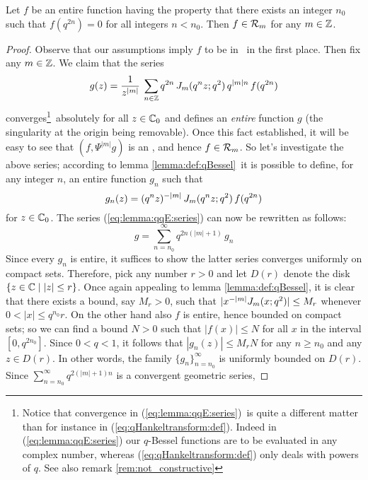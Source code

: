 \begin{lemma} \label{lemma:compactsupp_in_holS}
Let $f$ be an entire function having the property that there
exists an integer $n_0$ such that $f(q^{2n})=0$ for all integers $n<n_0$.
Then $f \in {\mathcal R}_{m}$ for any $m\in \mathbb{Z}$.
\end{lemma}
\begin{proof}
Observe that our assumptions imply $f$ to be in \Swqbis\ in the first place.
Then fix any $m\in \mathbb{Z}$. We claim that the series
\begin{equation}\label{eq:lemma:qqE:series}
    g(z) = \frac{1}{z^{|m|}}\: \sum_{n\in\mathbb{Z}}
          q^{2n}\, J_{m}(q^n z; q^2) \, q^{|m|n} \, f(q^{2n})
\end{equation}
converges\footnote{Notice that convergence in (\ref{eq:lemma:qqE:series})\
is quite a different matter than for instance in (\ref{eq:qHankeltransform:def}).
Indeed in (\ref{eq:lemma:qqE:series}) our $q$-Bessel functions are
to be evaluated in any complex number, whereas (\ref{eq:qHankeltransform:def})
only deals with powers of $q$.
See also remark \ref{rem:not_constructive}}\ absolutely for all $z\in \mathbb{C}_0$ and defines an
{\em entire\/} function $g$ (the singularity at the origin being removable).
Once this fact established, it will be easy to see that $(f, \Psi^{|m|} g)$
is an \Hmpair, and hence $f \in {\mathcal R}_{m}$.
So let's investigate the above series; according to lemma \ref{lemma:def:qBessel}\
it is possible to define, for any integer $n$, an entire function $g_n$ such that
$$ g_n (z) =  (q^n z)^{-|m|} \, J_{m}(q^n z; q^2) \,f(q^{2n}) $$
for $z\in \mathbb{C}_0$.
The series (\ref{eq:lemma:qqE:series}) can now be rewritten as follows:
\begin{equation}\label{eq:lemma:qqE:series:rewrite}
  g = \sum_{n=n_0}^\infty q^{2n(|m|+1)}\,g_n
\end{equation}
Since every $g_n$ is entire, it suffices  to show the latter series
converges uniformly on compact sets.
Therefore, pick any number $r>0$ and let $D(r)$ denote the disk
$\{z\in \mathbb{C} \mid |z| \leq r\}$.
Once again appealing to lemma \ref{lemma:def:qBessel}, it is clear that there exists
a bound, say $M_r>0$, such that $|x^{-|m|}J_{m}(x; q^2)| \leq M_r$ whenever
$0 < |x| \leq q^{n_0}r$. On the other hand also $f$ is entire, hence
bounded on compact sets; so we can find a bound $N>0$ such that
$|f(x)| \leq N$ for all $x$ in the interval $[0,q^{2n_0}]$.
Since $0<q<1$, it follows that $|g_n(z)| \leq M_r N$ for any $n \geq n_0$
and any $z\in D(r)$. In other words, the family $\{g_n\}_{n=n_0}^\infty$
is uniformly bounded on $D(r)$.
Since $\sum_{n=n_0}^\infty q^{2(|m|+1)n}$ is a convergent geometric series,

\end{proof}
